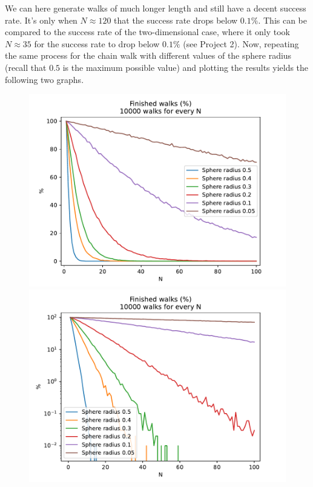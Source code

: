 \documentclass[a4paper,12pt]{article}
\begin{document}
We can here generate walks of much longer length and still have a decent success rate. It's only when
$N \approx 120$ that the success rate drops below $0.1\%$. This can be compared to the success rate of the
two-dimensional case, where it only took $N \approx 35$ for the success rate to drop below $0.1\%$ (see Project 2).
Now, repeating the same process for the chain walk with different values of the sphere radius (recall that $0.5$ is
the maximum possible value) and plotting the results yields the following two graphs.

\begin{figure}[!ht]
  \centering
  \begin{minipage}{0.49\textwidth}
    \includegraphics[width=\textwidth]{img/3-chain-fraction-finished.pdf}
  \end{minipage}
  \begin{minipage}{0.49\textwidth}
    \includegraphics[width=\textwidth]{img/3-chain-fraction-finished-log.pdf}
  \end{minipage}
\end{figure}
\end{document}
